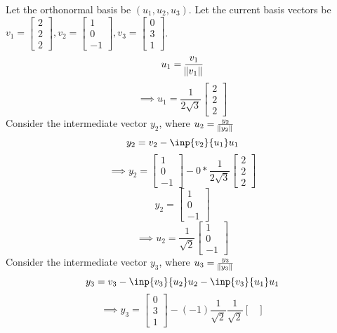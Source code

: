 \documentclass[solution,addpoints,12pt]{exam}
\newenvironment{Solution}{\begin{solution}}{\end{solution}}
\begin{document}
\begin{questions}
\begin{parts}
    \begin{Solution}
    Let the orthonormal basis be $\left(u_{1},u_{2},u_{3} \right)$. Let the current basis vectors be $v_{1} = \begin{bmatrix}
        2 \\ 2 \\ 2
    \end{bmatrix}, v_{2} = \begin{bmatrix}
        1 \\ 0 \\ -1
    \end{bmatrix}, v_{3} = \begin{bmatrix}
        0 \\ 3 \\ 1
    \end{bmatrix}$.
    \[u_{1} = \frac{v_{1}}{\norm{v_{1}}}\]
    \[\implies u_{1} = \frac{1}{2\sqrt{3}}\begin{bmatrix}
        2 \\ 2 \\ 2
    \end{bmatrix}\]
    Consider the intermediate vector $y_{2}$, where $u_{2} = \frac{y_{2}}{\norm{y_{2}}}$
    \[y_{2} = v_{2} - \inp{v_{2}}{u_{1}}u_{1}\]
    \[\implies y_{2} = \begin{bmatrix}
        1 \\ 0 \\ -1
    \end{bmatrix} - 0*\frac{1}{2\sqrt{3}}\begin{bmatrix}
        2 \\ 2 \\ 2
    \end{bmatrix}\]
    \[y_{2} = \begin{bmatrix}
        1 \\ 0 \\ -1
    \end{bmatrix}\]
    \[\implies u_{2} = \frac{1}{\sqrt{2}}\begin{bmatrix}
        1 \\ 0 \\ -1
    \end{bmatrix}\]
    Consider the intermediate vector $y_{3}$, where $u_{3} = \frac{y_{3}}{\norm{y_{3}}}$
    \[y_{3} = v_{3} - \inp{v_{3}}{u_{2}}u_{2} - \inp{v_{3}}{u_{1}}u_{1}\]
    \[\implies y_{3} = \begin{bmatrix}
        0 \\ 3 \\ 1
    \end{bmatrix} - (-1)\frac{1}{\sqrt{2}}\frac{1}{\sqrt{2}}\begin{bmatrix}

\end{bmatrix}\]
\end{Solution}
\end{parts}
\end{questions}
\end{document}
